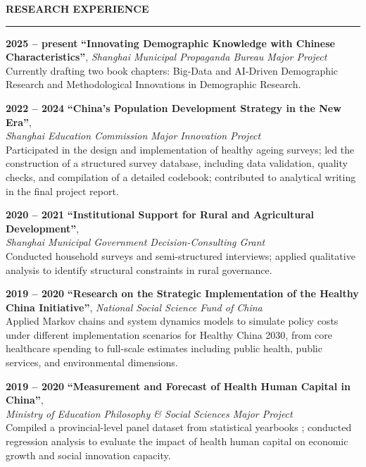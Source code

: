\documentclass{resume} %
\renewenvironment{rSection}[1]{
\sectionskip
\textcolor{CarnegieMellonRed}{\MakeUppercase{#1}} %
\sectionlineskip
\hrule %
\begin{list}{}{
\setlength{\leftmargin}{1.5em} %
}
\item[]
}{
\end{list}
}
\begin{document}
\begin{rSection}{\textbf{Research Experience}}

\textbf{2025 -- present } \quad \textbf{“Innovating Demographic Knowledge with Chinese Characteristics”}, \textit{Shanghai Municipal Propaganda Bureau Major Project}\\
\textcolor{RoyalBlueCustom}{
Currently drafting two book chapters: Big-Data and AI-Driven Demographic Research and Methodological Innovations in Demographic Research.}

\textbf{2022 -- 2024} \quad \textbf{“China’s Population Development Strategy in the New Era”}, \\
\textit{Shanghai Education Commission Major Innovation Project}\\
\textcolor{RoyalBlueCustom}{
Participated in the design and implementation of healthy ageing surveys; led the construction of a structured survey database, including data validation, quality checks, and compilation of a detailed codebook; contributed to analytical writing in the final project report.
}

\textbf{2020 -- 2021} \quad \textbf{“Institutional Support for Rural and Agricultural Development”}, \\
\textit{Shanghai Municipal Government Decision-Consulting Grant}\\
\textcolor{RoyalBlueCustom}{
Conducted household surveys and semi-structured interviews; applied qualitative analysis to identify structural constraints in rural governance.
}

\textbf{2019 -- 2020} \quad \textbf{“Research on the Strategic Implementation of the Healthy China Initiative”}, \textit{National Social Science Fund of China}\\
\textcolor{RoyalBlueCustom}{
Applied Markov chains and system dynamics models to simulate policy costs under different implementation scenarios for Healthy China 2030, from core healthcare spending to full-scale estimates including public health, public services, and environmental dimensions.
}

\textbf{2019 -- 2020} \quad \textbf{“Measurement and Forecast of Health Human Capital in China”}, \\
\textit{Ministry of Education Philosophy \& Social Sciences Major Project}\\
\textcolor{RoyalBlueCustom}{
Compiled a provincial-level panel dataset from statistical yearbooks ; conducted regression analysis to evaluate the impact of health human capital on economic growth and social innovation capacity.
}

\end{rSection}
\end{document}
